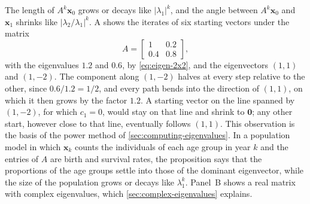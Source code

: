 The length of $A^k\mathbf x_0$ grows or decays like $|\lambda_1|^k$, and the angle between $A^k\mathbf x_0$ and $\mathbf x_1$ shrinks like $|\lambda_2/\lambda_1|^k$. A shows the iterates of six starting vectors under the matrix
\[
A=\begin{bmatrix}1&0.2\\0.4&0.8\end{bmatrix},
\]
with the eigenvalues $1.2$ and $0.6$, by \eqref{eq:eigen-2x2}, and the eigenvectors $(1,1)$ and $(1,-2)$. The component along $(1,-2)$ halves at every step relative to the other, since $0.6/1.2=1/2$, and every path bends into the direction of $(1,1)$, on which it then grows by the factor $1.2$. A starting vector on the line spanned by $(1,-2)$, for which $c_1=0$, would stay on that line and shrink to $\mathbf 0$; any other start, however close to that line, eventually follows $(1,1)$. This observation is the basis of the power method of \cref{sec:computing-eigenvalues}. In a population model in which $\mathbf x_k$ counts the individuals of each age group in year $k$ and the entries of $A$ are birth and survival rates, the proposition says that the proportions of the age groups settle into those of the dominant eigenvector, while the size of the population grows or decays like $\lambda_1^k$. Panel~B shows a real matrix with complex eigenvalues, which \cref{sec:complex-eigenvalues} explains.

